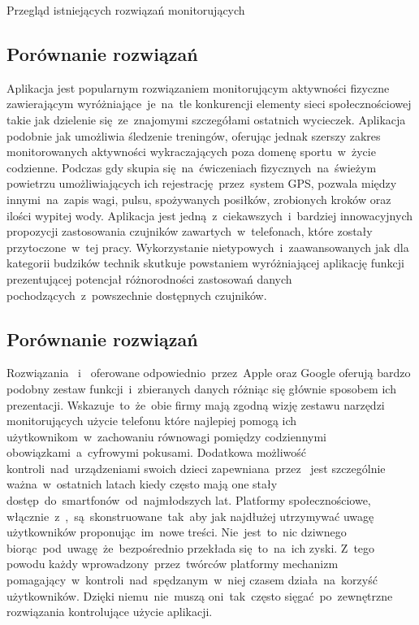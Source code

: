 \begin{chapter}{Przegląd istniejących rozwiązań monitorujących}
	\subsection{Porównanie rozwiązań}
	Aplikacja  jest popularnym rozwiązaniem monitorującym aktywności fizyczne zawierającym wyróżniające~je~na~tle konkurencji elementy sieci społecznościowej takie jak dzielenie się~ze~znajomymi szczegółami ostatnich wycieczek. Aplikacja  podobnie jak  umożliwia śledzenie treningów, oferując jednak szerszy zakres monitorowanych aktywności wykraczających poza domenę sportu~w~życie codzienne. Podczas gdy  skupia się~na~ćwiczeniach fizycznych~na~świeżym powietrzu umożliwiających ich rejestrację~przez~system GPS,  pozwala między innymi~na~zapis wagi, pulsu, spożywanych posiłków, zrobionych kroków oraz ilości wypitej wody. Aplikacja  jest jedną~z~ciekawszych~i~bardziej innowacyjnych propozycji zastosowania czujników zawartych~w~telefonach, które zostały przytoczone~w~tej pracy.  Wykorzystanie nietypowych~i~zaawansowanych jak dla kategorii budzików technik skutkuje powstaniem wyróżniającej aplikację funkcji prezentującej potencjał różnorodności zastosowań danych pochodzących~z~powszechnie dostępnych czujników.
	
	
	
	\subsection{Porównanie rozwiązań}
	Rozwiązania ~i~ oferowane odpowiednio~przez~Apple oraz Google oferują bardzo podobny zestaw funkcji~i~zbieranych danych różniąc się głównie sposobem ich prezentacji. Wskazuje~to~że~obie firmy mają zgodną wizję zestawu narzędzi monitorujących użycie telefonu które najlepiej pomogą ich użytkownikom~w~zachowaniu równowagi pomiędzy codziennymi obowiązkami~a~cyfrowymi pokusami. Dodatkowa możliwość kontroli~nad~urządzeniami swoich dzieci zapewniana~przez~ jest szczególnie ważna~w~ostatnich latach kiedy często mają one stały dostęp~do~smartfonów~od~najmłodszych lat. Platformy społecznościowe, włącznie~z~,~są~skonstruowane~tak~aby jak najdłużej utrzymywać uwagę użytkowników proponując~im~nowe treści. Nie~jest~to~nic dziwnego biorąc~pod~uwagę~że~bezpośrednio przekłada się~to~na~ich zyski. Z~tego powodu każdy wprowadzony~przez~twórców platformy  mechanizm pomagający~w~kontroli~nad~spędzanym~w~niej czasem działa~na~korzyść użytkowników. Dzięki niemu~nie~muszą oni~tak~często sięgać~po~zewnętrzne rozwiązania kontrolujące użycie aplikacji.
	
	
\end{chapter}
